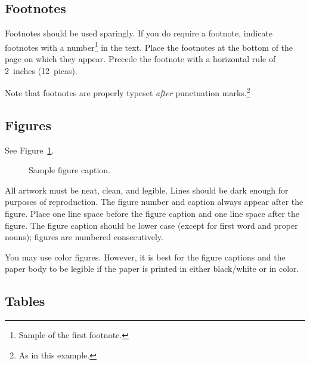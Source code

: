 \documentclass{article}
\begin{document}
%

\subsection{Footnotes}

Footnotes should be used sparingly.  If you do require a footnote, indicate
footnotes with a number\footnote{Sample of the first footnote.} in the
text. Place the footnotes at the bottom of the page on which they appear.
Precede the footnote with a horizontal rule of 2~inches (12~picas).

Note that footnotes are properly typeset \emph{after} punctuation
marks.\footnote{As in this example.}

\subsection{Figures}

\lipsum[7]
See Figure~\ref{fig:fig1}.

\begin{figure}
  \centering
  \fbox{\rule[-.5cm]{0cm}{4cm} \rule[-.5cm]{4cm}{0cm}}
  \caption{Sample figure caption.}
  \label{fig:fig1}
\end{figure}

All artwork must be neat, clean, and legible. Lines should be dark enough for
purposes of reproduction. The figure number and caption always appear after the
figure. Place one line space before the figure caption and one line space after
the figure. The figure caption should be lower case (except for first word and
proper nouns); figures are numbered consecutively.

You may use color figures.  However, it is best for the figure captions and the
paper body to be legible if the paper is printed in either black/white or in
color.

\subsection{Tables}
\end{document}
